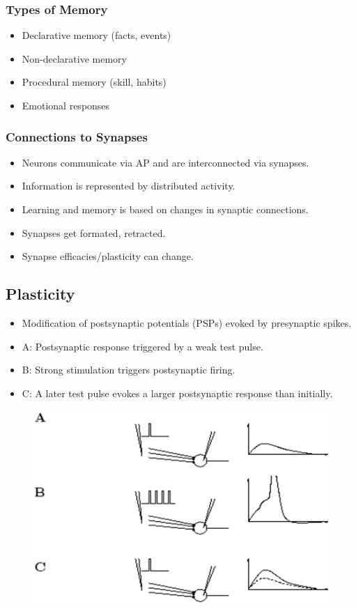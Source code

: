 \documentclass[a4paper, 12pt]{article}
\begin{document}
\subsubsection{Types of Memory}
\begin{itemize}[noitemsep,nolistsep]
	\item Declarative memory (facts, events)
	\item Non-declarative memory
	\item Procedural memory (skill, habits)
	\item Emotional responses
\end{itemize}

\subsubsection{Connections to Synapses}
\begin{itemize}[noitemsep,nolistsep]
	\item Neurons communicate via AP and are interconnected via synapses.
	\item Information is represented by distributed activity.
	\item Learning and memory is based on changes in synaptic connections.
	\item Synapses get formated, retracted.
	\item Synapse efficacies/plasticity can change.
\end{itemize}

\subsection{Plasticity}
\begin{itemize}[noitemsep,nolistsep]
	\item Modification of postsynaptic potentials (PSPs) evoked by presynaptic spikes.
	\item A: Postsynaptic response triggered by a weak test pulse.
	\item B: Strong stimulation triggers postsynaptic firing.
	\item C: A later test pulse evokes a larger postsynaptic response than initially.
\end{itemize}

\begin{figure}[H]
	\centering
	\includegraphics[scale=0.5]{plasticity.png}
\end{figure}
\end{document}
